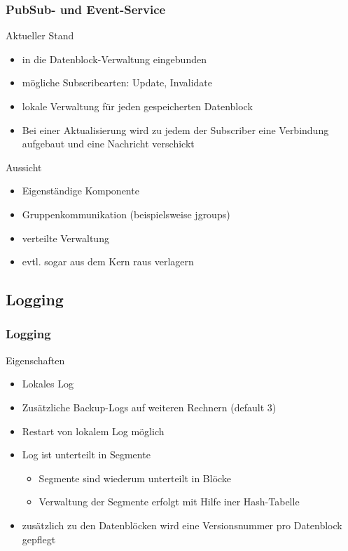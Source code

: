 \documentclass{beamer}
\begin{document}
		\begin{frame}
			\frametitle{PubSub- und Event-Service}

			\begin{block}{Aktueller Stand}
				\begin{itemize}
					\item in die Datenblock-Verwaltung eingebunden
					\item mögliche Subscribearten: Update, Invalidate
					\item lokale Verwaltung für jeden gespeicherten Datenblock
					\item Bei einer Aktualisierung wird zu jedem der Subscriber eine Verbindung aufgebaut und eine Nachricht verschickt
				\end{itemize}
			\end{block}

			\begin{block}{Aussicht}
				\begin{itemize}
					\item Eigenständige Komponente
					\item Gruppenkommunikation (beispielsweise jgroups)
					\item verteilte Verwaltung
					\item evtl. sogar aus dem Kern raus verlagern
				\end{itemize}
			\end{block}
		\end{frame}

	\subsection{Logging}

		\begin{frame}
			\frametitle{Logging}

			\begin{block}{Eigenschaften}
				\begin{itemize}
					\item Lokales Log
					\item Zusätzliche Backup-Logs auf weiteren Rechnern (default 3)
					\item Restart von lokalem Log möglich
					\item Log ist unterteilt in Segmente
						\begin{itemize}
							\item Segmente sind wiederum unterteilt in Blöcke
							\item Verwaltung der Segmente erfolgt mit Hilfe iner Hash-Tabelle
						\end{itemize}
					\item zusätzlich zu den Datenblöcken wird eine Versionsnummer pro Datenblock gepflegt
				\end{itemize}
			\end{block}
		\end{frame}
\end{document}
